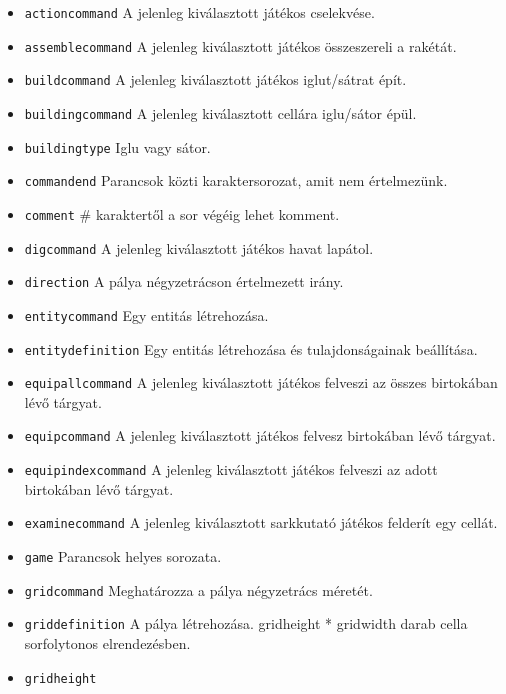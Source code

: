 \begin{itemize}
\item \texttt{action\textunderscore{}command}
A jelenleg kiválasztott játékos cselekvése.
\item \texttt{assemble\textunderscore{}command}
A jelenleg kiválasztott játékos összeszereli a rakétát.
\item \texttt{build\textunderscore{}command}
A jelenleg kiválasztott játékos iglut/sátrat épít.
\item \texttt{building\textunderscore{}command}
A jelenleg kiválasztott cellára iglu/sátor épül.
\item \texttt{building\textunderscore{}type}
Iglu vagy sátor.
\item \texttt{command\textunderscore{}end}
Parancsok közti karaktersorozat, amit nem értelmezünk.
\item \texttt{comment}
\# karaktertől a sor végéig lehet komment.
\item \texttt{dig\textunderscore{}command}
A jelenleg kiválasztott játékos havat lapátol.
\item \texttt{direction}
A pálya négyzetrácson értelmezett irány.
\item \texttt{entity\textunderscore{}command}
Egy entitás létrehozása.
\item \texttt{entity\textunderscore{}definition}
Egy entitás létrehozása és tulajdonságainak beállítása.
\item \texttt{equip\textunderscore{}all\textunderscore{}command}
A jelenleg kiválasztott játékos felveszi az összes birtokában lévő tárgyat.
\item \texttt{equip\textunderscore{}command}
A jelenleg kiválasztott játékos felvesz birtokában lévő tárgyat.
\item \texttt{equip\textunderscore{}index\textunderscore{}command}
A jelenleg kiválasztott játékos felveszi az adott birtokában lévő tárgyat.
\item \texttt{examine\textunderscore{}command}
A jelenleg kiválasztott sarkkutató játékos felderít egy cellát.
\item \texttt{game}
Parancsok helyes sorozata.
\item \texttt{grid\textunderscore{}command}
Meghatározza a pálya négyzetrács méretét.
\item \texttt{grid\textunderscore{}definition}
A pálya létrehozása. grid\textunderscore{}height * grid\textunderscore{}width darab cella sorfolytonos elrendezésben.
\item \texttt{grid\textunderscore{}height}

\end{itemize}
